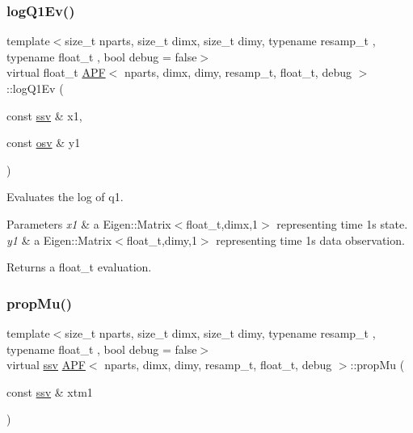 \subsubsection{\texorpdfstring{log\+Q1\+Ev()}{logQ1Ev()}}
{\footnotesize\ttfamily template$<$size\+\_\+t nparts, size\+\_\+t dimx, size\+\_\+t dimy, typename resamp\+\_\+t , typename float\+\_\+t , bool debug = false$>$ \\
virtual float\+\_\+t \hyperlink{classAPF}{A\+PF}$<$ nparts, dimx, dimy, resamp\+\_\+t, float\+\_\+t, debug $>$\+::log\+Q1\+Ev (\begin{DoxyParamCaption}\item[{const \hyperlink{classAPF_a8b170471292cd6fb5c3c19b55b42fc4e}{ssv} \&}]{x1,  }\item[{const \hyperlink{classAPF_ae4887b3f7121a7509397dd00bffedfe0}{osv} \&}]{y1 }\end{DoxyParamCaption})\hspace{0.3cm}{\ttfamily [pure virtual]}}



Evaluates the log of q1. 


\begin{DoxyParams}{Parameters}
{\em x1} & a Eigen\+::\+Matrix$<$float\+\_\+t,dimx,1$>$ representing time 1\textquotesingle{}s state. \\
\hline
{\em y1} & a Eigen\+::\+Matrix$<$float\+\_\+t,dimy,1$>$ representing time 1\textquotesingle{}s data observation. \\
\hline
\end{DoxyParams}
\begin{DoxyReturn}{Returns}
a float\+\_\+t evaluation. 
\end{DoxyReturn}
\mbox{\label{classAPF_aac5dbff4d903db9952dbf01e7aa25d44}} 
\subsubsection{\texorpdfstring{prop\+Mu()}{propMu()}}
{\footnotesize\ttfamily template$<$size\+\_\+t nparts, size\+\_\+t dimx, size\+\_\+t dimy, typename resamp\+\_\+t , typename float\+\_\+t , bool debug = false$>$ \\
virtual \hyperlink{classAPF_a8b170471292cd6fb5c3c19b55b42fc4e}{ssv} \hyperlink{classAPF}{A\+PF}$<$ nparts, dimx, dimy, resamp\+\_\+t, float\+\_\+t, debug $>$\+::prop\+Mu (\begin{DoxyParamCaption}\item[{const \hyperlink{classAPF_a8b170471292cd6fb5c3c19b55b42fc4e}{ssv} \&}]{xtm1 }\end{DoxyParamCaption})\hspace{0.3cm}{\ttfamily [pure virtual]}}



